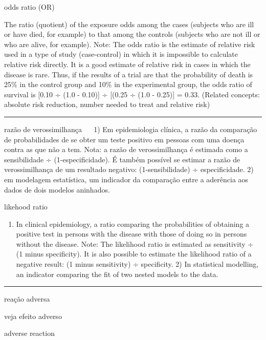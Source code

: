 \documentclass[
]{book}
\providecommand{\tightlist}{%
  \setlength{\itemsep}{0pt}\setlength{\parskip}{0pt}}
\begin{document}
odds ratio (OR)

The ratio (quotient) of the exposure odds among the cases (subjects who are ill or have died, for example) to that among the controls (subjects who are not ill or who are alive, for example). Note: The odds ratio is the estimate of relative risk used in a type of study (case-control) in which it is impossible to calculate relative risk directly. It is a good estimate of relative risk in cases in which the disease is rare. Thus, if the results of a trial are that the probability of death is 25\% in the control group and 10\% in the experimental group, the odds ratio of survival is {[}0.10 ÷ (1.0 - 0.10){]} ÷ {[}(0.25 ÷ (1.0 - 0.25){]} = 0.33. (Related concepts: absolute risk reduction, number needed to treat and relative risk)

\begin{center}\rule{0.5\linewidth}{0.5pt}\end{center}

razão de verossimilhança
 
1) Em epidemiologia clínica, a razão da comparação de probabilidades de se obter um teste positivo em pessoas com uma doença contra as que não a tem. Nota: a razão de verossimilhança é estimada como a sensibilidade ÷ (1-especificidade). É também possível se estimar a razão de verossimilhança de um resultado negativo: (1-sensibilidade) ÷ especificidade. 2) em modelagem estatística, um indicador da comparação entre a aderência aos dados de dois modelos aninhados.

likehood ratio

\begin{enumerate}
\def\labelenumi{\arabic{enumi})}
\tightlist
\item
  In clinical epidemiology, a ratio comparing the probabilities of obtaining a positive test in persons with the disease with those of doing so in persons without the disease. Note: The likelihood ratio is estimated as sensitivity ÷ (1 minus specificity). It is also possible to estimate the likelihood ratio of a negative result: (1 minus sensitivity) ÷ specificity. 2) In statistical modelling, an indicator comparing the fit of two nested models to the data.
\end{enumerate}

\begin{center}\rule{0.5\linewidth}{0.5pt}\end{center}

reação adversa

veja efeito adverso

adverse reaction
\end{document}
